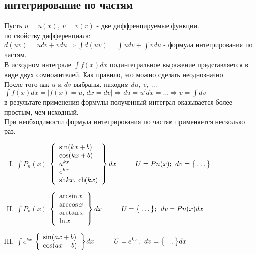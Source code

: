 \documentclass[a4paper,12pt]{bookest}
\theoremstyle{remark}
\newcommand\tab[1][1cm]{\hspace*{#1}}
\begin{document}
\subsection{интегрирование по частям}
Пусть $u=u(x),\>v=v(x)$ - две диффренцируемые функции. \\
по свойству дифференциала:\\$d(uv)=udv+vdu\Rightarrow\int d(uv)=\int udv+\int vdu$ - формула интегрирования по частям.\\
В исходном интеграле $\int f(x)dx$ подинтегральное выражение представляется в виде двух сомножителей. Как правило, это можно сделать неоднозначно.\\
После того как $u$ и $dv$ выбраны, находим $du,\>v,\>...$\\
$\int f(x)dx = |f(x)=u,\>dx=dv|\Rightarrow du=u'dx=...\Rightarrow v=\int dv$ \\
в результате применения формулы полученный интеграл оказывается более простым, чем исходный.\\
При необходимости формула интегрирования по частям применяется несколько раз.
\begin{enumerate}[I.]
	\item $\int P_n(x)$
		$\left\{\begin{array}{lr}
        \sin(kx+b)\\ \cos(kx+b)\\a^{kx}\\e^{kx}\\\textrm{sh}kx,\>\textrm{ch}(kx)
        \end{array}\right\}dx\tab U=Pn(x);\>\>dv=\big\{\dots\big\}$
        \item $\int P_n(x)$
		$\left\{\begin{array}{lr}
        \arcsin x\\ \arccos x\\\arctan x\\\ln x\\
        \end{array}\right\}dx\tab U=\big\{\dots\big\};\>\>dv=Pn(x)dx$
        \item $\int e^{kx}$
		$\left\{\begin{array}{lr}
        \sin (ax+b)\\ \cos (ax+b)\end{array}\right\}dx\tab U=e^{kx};\>\>dv=\big\{\dots\big\}dx$
\end{enumerate}
\end{document}
